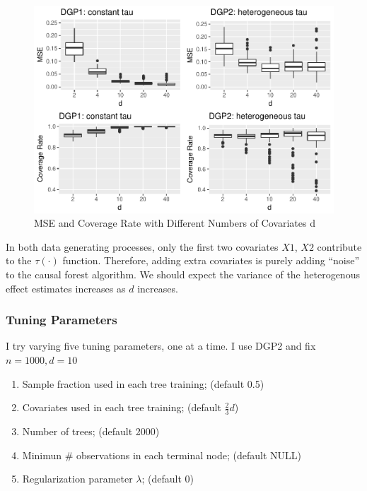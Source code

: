 \documentclass[]{article}
\providecommand{\tightlist}{%
  \setlength{\itemsep}{0pt}\setlength{\parskip}{0pt}}
\begin{document}
\begin{figure}[h!]
\includegraphics{report_files/figure-latex/fig3-1} \caption{\label{fig:fig3}MSE and Coverage Rate with Different Numbers of Covariates d}\label{fig:fig3}
\end{figure}

In both data generating processes, only the first two covariates \(X1\),
\(X2\) contribute to the \(\tau(\cdot)\) function. Therefore, adding
extra covariates is purely adding ``noise'' to the causal forest
algorithm. We should expect the variance of the heterogenous effect
estimates increases as \(d\) increases.

\subsubsection{Tuning Parameters}\label{tuning-parameters}

I try varying five tuning parameters, one at a time. I use DGP2 and fix
\(n=1000, d=10\)

\begin{enumerate}
\def\labelenumi{\arabic{enumi}.}
\tightlist
\item
  Sample fraction used in each tree training; (default 0.5)
\item
  Covariates used in each tree training; (default \(\frac{2}{3}d\))
\item
  Number of trees; (default 2000)
\item
  Minimun \# observations in each terminal node; (default NULL)
\item
  Regularization parameter \(\lambda\); (default 0)
\end{enumerate}
\end{document}
